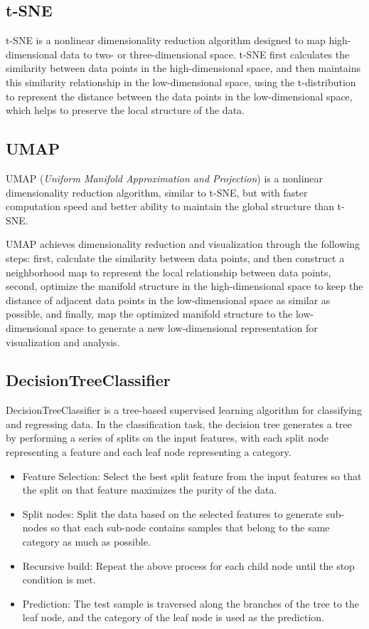\documentclass[conference]{IEEEtran}
\begin{document}
	\subsection{t-SNE}\label{AA}
	t-SNE is a nonlinear dimensionality reduction algorithm designed to map high-dimensional data to two- or three-dimensional space. t-SNE first calculates the similarity between data points in the high-dimensional space, and then maintains this similarity relationship in the low-dimensional space, using the t-distribution to represent the distance between the data points in the low-dimensional space, which helps to preserve the local structure of the data.
	
	\subsection{UMAP}\label{AA}
	UMAP (\emph{Uniform Manifold Approximation and Projection}) is a nonlinear dimensionality reduction algorithm, similar to t-SNE, but with faster computation speed and better ability to maintain the global structure than t-SNE.
	
	UMAP achieves dimensionality reduction and visualization through the following steps: first, calculate the similarity between data points, and then construct a neighborhood map to represent the local relationship between data points, second, optimize the manifold structure in the high-dimensional space to keep the distance of adjacent data points in the low-dimensional space as similar as possible, and finally, map the optimized manifold structure to the low-dimensional space to generate a new low-dimensional representation for visualization and analysis.
	\subsection{DecisionTreeClassifier}\label{AA}
	DecisionTreeClassifier is a tree-based supervised learning algorithm for classifying and regressing data. In the classification task, the decision tree generates a tree by performing a series of splits on the input features, with each split node representing a feature and each leaf node representing a category.
	\begin{itemize}
		\item Feature Selection: Select the best split feature from the input features so that the split on that feature maximizes the purity of the data.
		\item Split nodes: Split the data based on the selected features to generate sub-nodes so that each sub-node contains samples that belong to the same category as much as possible.
		\item Recursive build: Repeat the above process for each child node until the stop condition is met.
		\item Prediction: The test sample is traversed along the branches of the tree to the leaf node, and the category of the leaf node is used as the prediction.
	\end{itemize}
	
\end{document}
